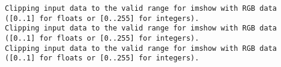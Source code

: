 \documentclass[11pt]{article}
\begin{document}
    \begin{Verbatim}[commandchars=\\\{\}]
Clipping input data to the valid range for imshow with RGB data ([0..1] for floats or [0..255] for integers).
Clipping input data to the valid range for imshow with RGB data ([0..1] for floats or [0..255] for integers).
Clipping input data to the valid range for imshow with RGB data ([0..1] for floats or [0..255] for integers).

    \end{Verbatim}

    \begin{center}
    \end{center}
    { \hspace*{\fill} \\}
    

    
    
    
    
\end{document}
